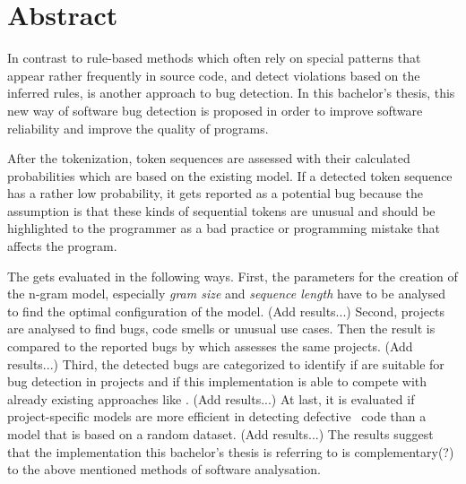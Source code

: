\chapter*{Abstract}

In contrast to rule-based methods which often rely on special patterns that appear rather frequently in source code, and detect violations based on the inferred rules, \ngram{} is another approach to bug detection. In this bachelor's thesis, this new way of software bug detection is proposed in order to improve software reliability and improve the quality of \scratch{} programs.

After the tokenization, token sequences are assessed with their calculated probabilities which are based on the existing model. If a detected token sequence has a rather low probability, it gets reported as a potential bug because the assumption is that these kinds of sequential tokens are unusual and should be highlighted to the programmer as a bad practice or programming mistake that affects the program.

The \ngram{} gets evaluated in the following ways. First, the parameters for the creation of the n-gram model, especially \textit{gram size} and \textit{sequence length} have to be analysed to find the optimal configuration of the model. (Add results...) Second, \scratch{} projects are analysed to find bugs, code smells or unusual use cases. Then the result is compared to the reported bugs by \litterbox{} which assesses the same projects. (Add results...) Third, the detected bugs are categorized to identify if  are suitable for bug detection in \scratch{} projects and if this implementation is able to compete with already existing approaches like \litterbox{}. (Add results...) At last, it is evaluated if project-specific models are more efficient in detecting defective \scratch\ code than a model that is based on a random dataset. (Add results...) The results suggest that the implementation this bachelor's thesis is referring to is complementary(?) to the above mentioned methods of software analysation.